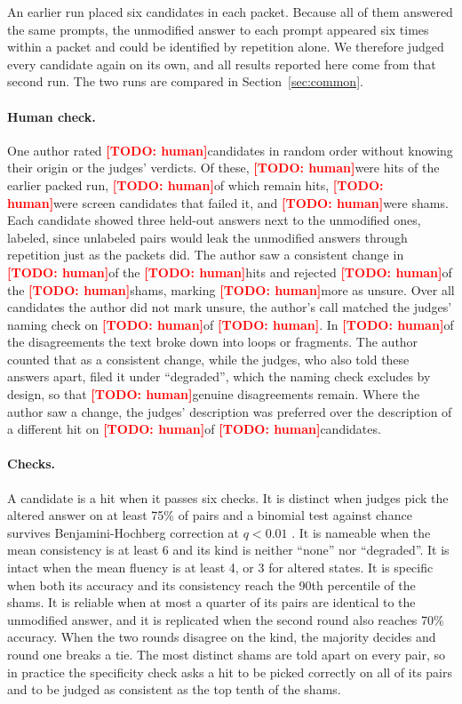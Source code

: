 \documentclass[11pt]{article}
\providecommand{\HumanRated}{\todo{human}}\providecommand{\HumanUnsure}{\todo{human}}\providecommand{\HumanChangeN}{\todo{human}}
\providecommand{\HumanChangeAgree}{\todo{human}}\providecommand{\HumanFitN}{\todo{human}}\providecommand{\HumanFitJudge}{\todo{human}}
\providecommand{\HumanHits}{\todo{human}}\providecommand{\HumanNonHits}{\todo{human}}\providecommand{\HumanShams}{\todo{human}}
\providecommand{\HumanHitsYes}{\todo{human}}\providecommand{\HumanShamsNo}{\todo{human}}\providecommand{\HumanShamsUnsure}{\todo{human}}
\providecommand{\HumanBroken}{\todo{human}}\providecommand{\HumanOtherDisagree}{\todo{human}}\providecommand{\HumanStillHits}{\todo{human}}
\newcommand{\todo}[1]{\textcolor{red}{\textbf{[TODO: #1]}}}
\begin{document}
An earlier run placed six candidates in each packet. Because all of them answered the same prompts, the unmodified
answer to each prompt appeared six times within a packet and could be identified by repetition alone. We therefore
judged every candidate again on its own, and all results reported here come from that second run. The two runs are
compared in Section~\ref{sec:common}.

\paragraph{Human check.} One author rated \HumanRated candidates in random order without knowing their origin or
the judges' verdicts. Of these, \HumanHits were hits of the earlier packed run, \HumanStillHits of which remain hits,
\HumanNonHits were screen candidates that failed it, and \HumanShams were shams. Each candidate showed three held-out
answers next to the unmodified ones, labeled, since unlabeled pairs would leak the unmodified answers through
repetition just as the packets did. The author saw a consistent change in \HumanHitsYes of the \HumanHits hits and
rejected \HumanShamsNo of the \HumanShams shams, marking \HumanShamsUnsure more as unsure. Over all candidates the
author did not mark unsure, the author's call matched the judges' naming check on \HumanChangeAgree of
\HumanChangeN. In \HumanBroken of the disagreements the text broke down into loops or fragments. The author counted
that as a consistent change, while the judges, who also told these answers apart, filed it under ``degraded'', which
the naming check excludes by design, so that \HumanOtherDisagree genuine disagreements remain. Where the author saw a
change, the judges' description was preferred over the description of a different hit on \HumanFitJudge of
\HumanFitN candidates.

\paragraph{Checks.} A candidate is a hit when it passes six checks. It is distinct when judges pick the altered
answer on at least 75\% of pairs and a binomial test against chance survives Benjamini-Hochberg correction at
$q < 0.01$ \citep{benjamini1995fdr}. It is nameable when the mean consistency is at least 6 and its kind is neither
``none'' nor ``degraded''. It is intact when the mean fluency is at least 4, or 3 for altered states. It is specific
when both its accuracy and its consistency reach the 90th percentile of the shams. It is reliable when at most a
quarter of its pairs are identical to the unmodified answer, and it is replicated when the second round also reaches
70\% accuracy. When the two rounds disagree on the kind, the majority decides and round one breaks a tie. The most
distinct shams are told apart on every pair, so in practice the specificity check asks a hit to be picked correctly
on all of its pairs and to be judged as consistent as the top tenth of the shams.
\end{document}
